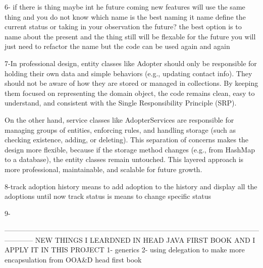 6- if there is thing maybe int he future coming new features will use the same thing and you do not know which name is the best
naming it name define the current status or taking in your observation the future?
the best option is to name about the present and the thing still will be flexable for the future you will just need to refactor the name 
but the code can be used again and again 

7-In professional design, entity classes like Adopter should only be responsible for holding their own data and simple behaviors (e.g., updating contact info).
They should not be aware of how they are stored or managed in collections.
By keeping them focused on representing the domain object, the code remains clean, easy to understand, and consistent with the Single Responsibility Principle (SRP).

On the other hand, service classes like AdopterServices are responsible for managing groups of entities, enforcing rules, and handling storage (such as checking existence, adding, or deleting). 
This separation of concerns makes the design more flexible, because if the storage method changes (e.g., from HashMap to a database), the entity classes remain untouched. 
This layered approach is more professional, maintainable, and scalable for future growth.

8-track adoption history means to add adoption to the history and display all the adoptions until now 
track status is means to change specific status 

9- 































------------------------------------------------------------------------------------------------------------------------
                                          NEW THINGS I LEARDNED IN HEAD JAVA FIRST BOOK AND I APPLY IT IN THIS PROJECT
1- generics
2- using delegation to make more encapsulation from OOA&D head first book 
